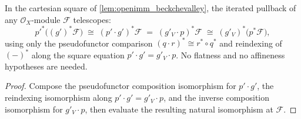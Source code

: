 \begin{lemma}\leanok
  \label{lem:openimm_bc_telescope}
  In the cartesian square of \cref{lem:openimm_beckchevalley}, the iterated pullback of any
  \(\mathcal{O}_X\)-module \(\mathcal{F}\) telescopes:
  \[
    p'^*\bigl((g')^*\mathcal{F}\bigr)
      \;\cong\; (p' \cdot g')^*\mathcal{F}
      \;=\; (g'_V \cdot p)^*\mathcal{F}
      \;\cong\; (g'_V)^*\bigl(p^*\mathcal{F}\bigr),
  \]
  using only the pseudofunctor comparison \((q \cdot r)^* \cong r^* \circ q^*\) and reindexing of
  \((-)^*\) along the square equation \(p' \cdot g' = g'_V \cdot p\). No flatness and no
  affineness hypotheses are needed.
\end{lemma}
\begin{proof}
  Compose the pseudofunctor composition isomorphism for \(p' \cdot g'\), the reindexing
  isomorphism along \(p' \cdot g' = g'_V \cdot p\), and the inverse composition isomorphism for
  \(g'_V \cdot p\), then evaluate the resulting natural isomorphism at \(\mathcal{F}\).
\end{proof}

